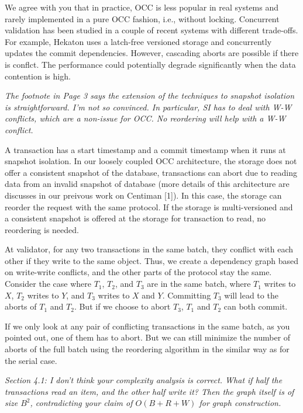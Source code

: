 \documentclass{article}
\begin{document}
\bigskip
We agree with you that in practice, OCC is less popular in real systems and rarely implemented in a pure OCC fashion, i.e., without locking. Concurrent validation has been studied in a couple of recent systems with different trade-offs. For example, Hekaton uses a latch-free versioned storage and concurrently updates the commit dependencies. However, cascading aborts are possible if there is conflct. The performance could potentially degrade significantly when the data contention is high.
\bigskip

\emph{The footnote in Page 3 says the extension of the techniques to snapshot isolation is straightforward. I'm not so convinced. In particular, SI has to deal with W-W conflicts, which are a non-issue for OCC. No reordering will help with a W-W conflict.
}


\bigskip
A transaction has a start timestamp and a commit timestamp when it runs at snapshot isolation. In our loosely coupled OCC architecture, the storage does not offer a consistent snapshot of the database, transactions can abort due to reading data from an invalid snapshot of database (more details of this architecture are discusses in our preivous work on Centiman [1]). In this case, the storage can reorder the request with the same protocol. If the storage is multi-versioned and a consistent snapshot is offered at the storage for transaction to read, no reordering is needed.

At validator, for any two transactions in the same batch, they conflict with each other if they write to the same object. Thus, we create a dependency graph based on write-write conflicts, and the other parts of the protocol stay the same. Consider the case where $T_1$, $T_2$, and $T_3$ are in the same batch, where $T_1$ writes to $X$, $T_2$ writes to $Y$, and $T_3$ writes to $X$ and $Y$. Committing $T_3$ will lead to the aborts of $T_1$ and $T_2$. But if we choose to abort $T_3$, $T_1$ and $T_2$ can both commit.

If we only look at any pair of conflicting transactions in the same batch, as you pointed out, one of them has to abort. But we can still minimize the number of aborts of the full batch using the reordering algorithm in the similar way as for the serial case.

\bigskip

\emph{Section 4.1: I don't think your complexity analysis is correct. What if half the transactions read an item, and the other half write it? Then the graph itself is of size $B^2$, contradicting your claim of $O(B+R+W)$ for graph construction.}
\end{document}
